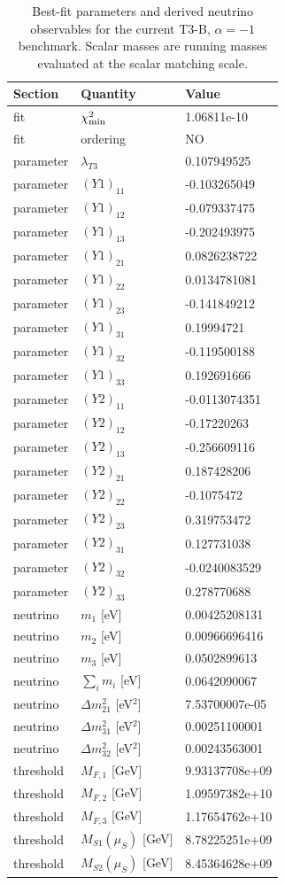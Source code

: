 \begin{table}[htbp]
\centering
\caption{Best-fit parameters and derived neutrino observables for the current T3-B, $\alpha=-1$ benchmark. Scalar masses are running masses evaluated at the scalar matching scale.}
\label{tab:t3-b-bestfit}
\begin{tabular}{lll}
\hline
Section & Quantity & Value \\
\hline
fit & $\chi^2_{\rm min}$ & 1.06811e-10 \\
fit & ordering & NO \\
\hline
parameter & $\lambda_{T3}$ & 0.107949525 \\
parameter & $(Y1)_{11}$ & -0.103265049 \\
parameter & $(Y1)_{12}$ & -0.079337475 \\
parameter & $(Y1)_{13}$ & -0.202493975 \\
parameter & $(Y1)_{21}$ & 0.0826238722 \\
parameter & $(Y1)_{22}$ & 0.0134781081 \\
parameter & $(Y1)_{23}$ & -0.141849212 \\
parameter & $(Y1)_{31}$ & 0.19994721 \\
parameter & $(Y1)_{32}$ & -0.119500188 \\
parameter & $(Y1)_{33}$ & 0.192691666 \\
parameter & $(Y2)_{11}$ & -0.0113074351 \\
parameter & $(Y2)_{12}$ & -0.17220263 \\
parameter & $(Y2)_{13}$ & -0.256609116 \\
parameter & $(Y2)_{21}$ & 0.187428206 \\
parameter & $(Y2)_{22}$ & -0.1075472 \\
parameter & $(Y2)_{23}$ & 0.319753472 \\
parameter & $(Y2)_{31}$ & 0.127731038 \\
parameter & $(Y2)_{32}$ & -0.0240083529 \\
parameter & $(Y2)_{33}$ & 0.278770688 \\
\hline
neutrino & $m_1$ [eV] & 0.00425208131 \\
neutrino & $m_2$ [eV] & 0.00966696416 \\
neutrino & $m_3$ [eV] & 0.0502899613 \\
neutrino & $\sum_i m_i$ [eV] & 0.0642090067 \\
neutrino & $\Delta m_{21}^2$ [eV$^2$] & 7.53700007e-05 \\
neutrino & $\Delta m_{31}^2$ [eV$^2$] & 0.00251100001 \\
neutrino & $\Delta m_{32}^2$ [eV$^2$] & 0.00243563001 \\
\hline
threshold & $M_{F,1}$ [GeV] & 9.93137708e+09 \\
threshold & $M_{F,2}$ [GeV] & 1.09597382e+10 \\
threshold & $M_{F,3}$ [GeV] & 1.17654762e+10 \\
threshold & $M_{S1}(\mu_S)$ [GeV] & 8.78225251e+09 \\
threshold & $M_{S2}(\mu_S)$ [GeV] & 8.45364628e+09 \\
\hline
\end{tabular}
\end{table}
